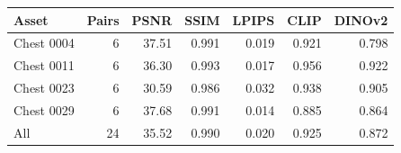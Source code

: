 \begin{tabular}{lrrrrrr}
\toprule
Asset & Pairs & PSNR & SSIM & LPIPS & CLIP & DINOv2 \\
\midrule
Chest 0004 & 6 & 37.51 & 0.991 & 0.019 & 0.921 & 0.798 \\
Chest 0011 & 6 & 36.30 & 0.993 & 0.017 & 0.956 & 0.922 \\
Chest 0023 & 6 & 30.59 & 0.986 & 0.032 & 0.938 & 0.905 \\
Chest 0029 & 6 & 37.68 & 0.991 & 0.014 & 0.885 & 0.864 \\
All & 24 & 35.52 & 0.990 & 0.020 & 0.925 & 0.872 \\
\bottomrule
\end{tabular}
